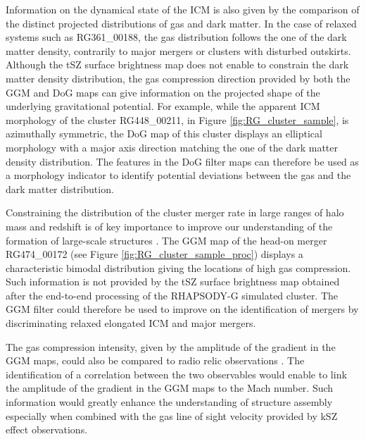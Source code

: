 \documentclass[twocolumn,traditabstract]{aa}
\begin{document}
Information on the dynamical state of the ICM is also given by the comparison of the distinct projected distributions of gas and dark matter. In the case of relaxed systems such as RG361\_00188, the gas distribution follows the one of the dark matter density, contrarily to major mergers or clusters with disturbed outskirts. Although the tSZ surface brightness map does not enable to constrain the dark matter density distribution, the gas compression direction provided by both the GGM and DoG maps can give information on the projected shape of the underlying gravitational potential. For example, while the apparent ICM morphology of the cluster RG448\_00211, in Figure \ref{fig:RG_cluster_sample}, is azimuthally symmetric, the DoG map of this cluster displays an elliptical morphology with a major axis direction matching the one of the dark matter density distribution. The features in the DoG filter maps can therefore be used as a morphology indicator to identify potential deviations between the gas and the dark matter distribution.

Constraining the distribution of the cluster merger rate in large ranges of halo mass and redshift is of key importance to improve our understanding of the formation of large-scale structures \citep[e.g.][]{Fakhouri2010}. The GGM map of the head-on merger RG474\_00172 (see Figure \ref{fig:RG_cluster_sample_proc}) displays a characteristic bimodal distribution giving the locations of high gas compression. Such information is not provided by the tSZ surface brightness map obtained after the end-to-end processing of the RHAPSODY-G simulated cluster. The GGM filter could therefore be used to improve on the identification of mergers by discriminating relaxed elongated ICM and major mergers. 

The gas compression intensity, given by the amplitude of the gradient in the GGM maps, could also be compared to radio relic observations \citep[e.g.][]{vanWeeren2010}. The identification of a correlation between the two observables would enable to link the amplitude of the gradient in the GGM maps to the Mach number. Such information would greatly enhance the understanding of structure assembly especially when combined with the gas line of sight velocity provided by kSZ effect observations.

\end{document}
